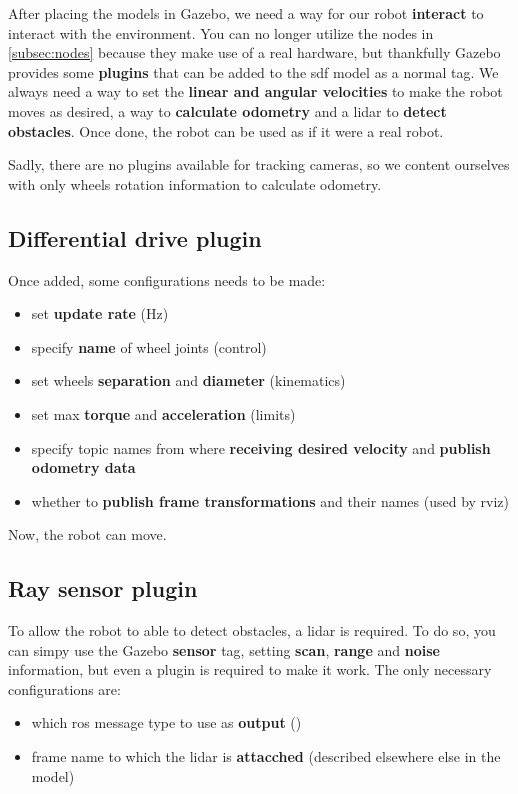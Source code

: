 After placing the models in Gazebo, we need a way for our robot \textbf{interact} to interact with the environment. You can no longer utilize the nodes in \autoref{subsec:nodes} because they make use of a real hardware, but thankfully Gazebo provides some \textbf{plugins} that can be added to the \acrshort{sdf} model as a normal tag. We always need a way to set the \textbf{linear and angular velocities} to make the robot moves as desired, a way to \textbf{calculate odometry} and a lidar to \textbf{detect obstacles}. Once done, the robot can be used as if it were a real robot.

Sadly, there are no plugins available for tracking cameras, so we content ourselves with only wheels rotation information to calculate odometry. 

\subsection{Differential drive plugin}

Once added, some configurations needs to be made:
\begin{itemize}
    \item set \textbf{update rate} (Hz)
    \item specify \textbf{name} of wheel joints (control)
    \item set wheels \textbf{separation} and \textbf{diameter} (kinematics)
    \item set max \textbf{torque} and \textbf{acceleration} (limits)
    \item specify topic names from where \textbf{receiving desired velocity} and \textbf{publish odometry data}
    \item whether to \textbf{publish frame transformations} and their names (used by \acrshort{rviz})
\end{itemize}
Now, the robot can move.

\subsection{Ray sensor plugin}

To allow the robot to able to detect obstacles, a lidar is required. To do so, you can simpy use the Gazebo \textbf{sensor}  tag, setting \textbf{scan}, \textbf{range} and \textbf{noise} information, but even a plugin is required to make it work. The only necessary configurations are:
\begin{itemize}
    \item which \acrshort{ros} message type to use as \textbf{output} ()
    \item frame name to which the lidar is \textbf{attacched} (described elsewhere else in the model)
\end{itemize}